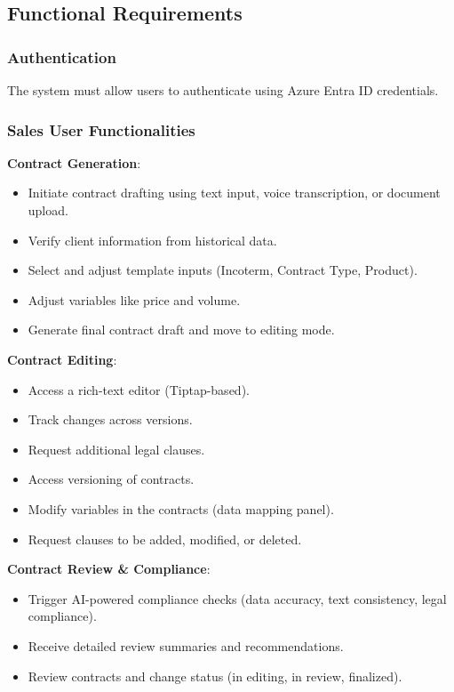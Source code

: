 \subsection{Functional Requirements}

\subsubsection{Authentication}
The system must allow users to authenticate using Azure Entra ID credentials.

\subsubsection{Sales User Functionalities}

\textbf{Contract Generation}:
\begin{itemize}
\item Initiate contract drafting using text input, voice transcription, or document upload.
\item Verify client information from historical data.
\item Select and adjust template inputs (Incoterm, Contract Type, Product).
\item Adjust variables like price and volume.
\item Generate final contract draft and move to editing mode.
\end{itemize}

\textbf{Contract Editing}:
\begin{itemize}
\item Access a rich-text editor (Tiptap-based).
\item Track changes across versions.
\item Request additional legal clauses.
\item Access versioning of contracts.
\item Modify variables in the contracts (data mapping panel).
\item Request clauses to be added, modified, or deleted.

\end{itemize}

\textbf{Contract Review \& Compliance}:
\begin{itemize}
\item Trigger AI-powered compliance checks (data accuracy, text consistency, legal compliance).
\item Receive detailed review summaries and recommendations.
\item Review contracts and change status (in editing, in review, finalized).
\end{itemize}


